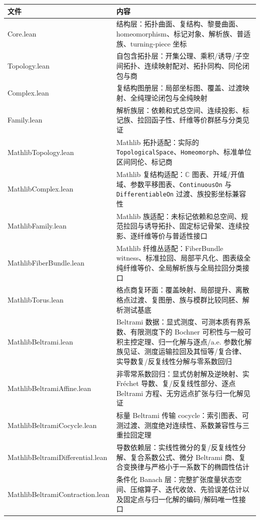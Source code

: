 \documentclass[UTF8,fontset=none,a4paper,11pt]{ctexart}
\begin{document}
\begin{center}
\scriptsize
\begin{tabularx}{\textwidth}{>{\ttfamily}lX}
\toprule
文件 & 内容 \\
\midrule
Core.lean & 结构层：拓扑曲面、复结构、黎曼曲面、homeomorphism、标记对象、解析族、普适族、turning-piece 坐标 \\
Topology.lean & 自包含拓扑层：开集公理、乘积/诱导/子空间拓扑、连续映射配对、拓扑同构、同伦闭包与商 \\
Complex.lean & 复结构图册层：局部坐标图、覆盖、过渡映射、全纯理论闭包与全纯映射 \\
Family.lean & 解析族层：依赖和式总空间、连续投影、标记族、拉回函子性、纤维等价群胚与分类见证 \\
MathlibTopology.lean & Mathlib 拓扑适配：实际的 \texttt{TopologicalSpace}、\texttt{Homeomorph}、标准单位区间同伦、标记商 \\
MathlibComplex.lean & Mathlib 复结构适配：\(\mathbb C\) 图表、开域/开值域、参数平移图表、\texttt{ContinuousOn} 与 \texttt{DifferentiableOn} 过渡、族投影坐标兼容性 \\
MathlibFamily.lean & Mathlib 族适配：未标记依赖和总空间、规范拉回与诱导拓扑、固定标记骨架、连续投影、逐纤维等价与普适性接口 \\
MathlibFiberBundle.lean & Mathlib 纤维丛适配：FiberBundle witness、标准拉回、局部平凡化、图表级全纯纤维等价、全局解析族与全局拉回分类接口 \\
MathlibTorus.lean & 格点商复环面：覆盖映射、局部提升、离散格点过渡、复图册、族与模群比较同胚、解析测试基底 \\
MathlibBeltrami.lean & Beltrami 数据：显式测度、可测本质有界系数、有限测度下的 Bochner 可积性与一般可积主控定理、归一化解与逐点/a.e. 参数化解族见证、测度运输拉回及其恒等/复合律、实导数复/反复线性分解与零系数回归 \\
MathlibBeltramiAffine.lean & 非零常系数回归：显式仿射解及逆映射、实 Fréchet 导数、复/反复线性部分、逐点 Beltrami 方程、无穷远点扩张与归一化解见证 \\
MathlibBeltramiCocycle.lean & 标量 Beltrami 传输 cocycle：索引图表、可测过渡、测度绝对连续性、系数兼容性与三重拉回定理 \\
MathlibBeltramiDifferential.lean & 导数依赖层：实线性微分的复/反复线性分解、复合系数公式、微分 Beltrami 商、复合变换律与严格小于一系数下的椭圆性估计 \\
MathlibBeltramiContraction.lean & 条件化 Banach 层：完整扩张度量状态空间、压缩算子、迭代收敛、先验误差估计以及固定点与归一化解的编码/解码唯一性接口 \\

\end{tabularx}
\end{center}
\end{document}
